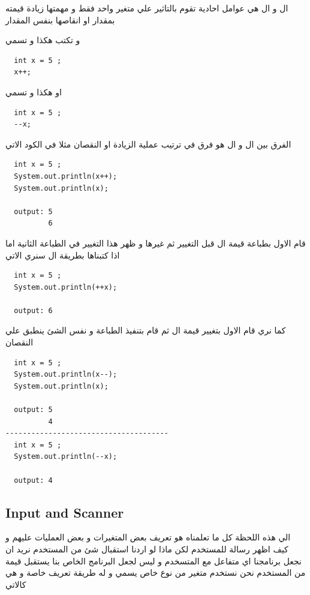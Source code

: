\begin{AR}
  ال \LR{(++)} و ال \LR{(-{}-)} هي عوامل احادية  تقوم بالتاثير علي متغير واحد فقط و مهمتها زيادة قيمته بمقدار  او انقاصها بنفس المقدار

  و تكتب هكذا و تسمي 
\end{AR}
\begin{verbatim}
  int x = 5 ;
  x++;  
\end{verbatim}
\begin{AR}
  او هكذا و تسمي 
\end{AR}
\begin{verbatim}
  int x = 5 ;
  --x;  
\end{verbatim}
\begin{AR}
  الفرق بين ال  و ال  هو فرق في ترتيب عملية الزيادة او النقصان
  مثلا في الكود الاتي 
\end{AR}
\begin{verbatim}
  int x = 5 ;
  System.out.println(x++);
  System.out.println(x);

  output: 5
          6
\end{verbatim}
\begin{AR}
  قام الاول بطباعة قيمة ال  قبل التغيير ثم غيرها و ظهر هذا التغيير في الطباعة الثانية اما اذا كتبناها بطريقة ال 
  سنري الاتي 
\end{AR}
\begin{verbatim}
  int x = 5 ;
  System.out.println(++x);

  output: 6
\end{verbatim}
\begin{AR}
  كما نري قام الاول بتغيير قيمة ال  ثم قام بتنفيذ الطباعة و نفس الشئ ينطبق علي النقصان 
\end{AR}
\begin{verbatim}
  int x = 5 ;
  System.out.println(x--);
  System.out.println(x);

  output: 5
          4
--------------------------------------
  int x = 5 ;
  System.out.println(--x);

  output: 4
\end{verbatim}

\subsection{Input and Scanner}
\begin{AR}
  الي هذه اللحظة كل ما تعلمناه هو تعريف بعض المتغيرات و بعض العمليات عليهم و كيف اظهر رسالة للمستخدم لكن ماذا لو اردنا استقبال شئ من المستخدم 
  نريد ان نجعل برنامجنا  اي متفاعل مع المتسخدم و ليس 
  لجعل البرنامج الخاص بنا يستقبل قيمة من المستخدم نحن نستخدم متغير من نوع خاص يسمي  و له طريقة تعريف خاصة و هي كالاتي 
\end{AR}

